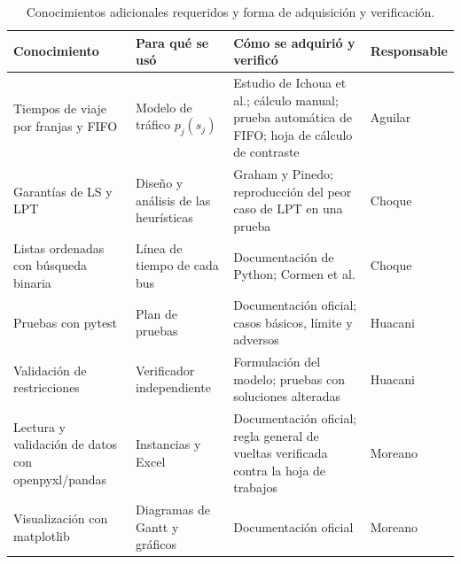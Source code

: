 \begin{table}[H]
\centering\small
\caption{Conocimientos adicionales requeridos y forma de adquisición y verificación.}\label{tab:aprendizaje}
\begin{tabularx}{\textwidth}{L{3.4cm}L{2.8cm}YL{1.9cm}}
\toprule
Conocimiento & Para qué se usó & Cómo se adquirió y verificó & Responsable \\
\midrule
Tiempos de viaje por franjas y FIFO & Modelo de tráfico $p_j(s_j)$ & Estudio de Ichoua et al.; cálculo manual; prueba automática de FIFO; hoja de cálculo de contraste & Aguilar \\
Garantías de LS y LPT & Diseño y análisis de las heurísticas & Graham y Pinedo; reproducción del peor caso de LPT en una prueba & Choque \\
Listas ordenadas con búsqueda binaria & Línea de tiempo de cada bus & Documentación de Python; Cormen et al. & Choque \\
Pruebas con pytest & Plan de pruebas & Documentación oficial; casos básicos, límite y adversos & Huacani \\
Validación de restricciones & Verificador independiente & Formulación del modelo; pruebas con soluciones alteradas & Huacani \\
Lectura y validación de datos con openpyxl/pandas & Instancias y Excel & Documentación oficial; regla general de vueltas verificada contra la hoja de trabajos & Moreano \\
Visualización con matplotlib & Diagramas de Gantt y gráficos & Documentación oficial & Moreano \\
\bottomrule
\end{tabularx}
\end{table}
